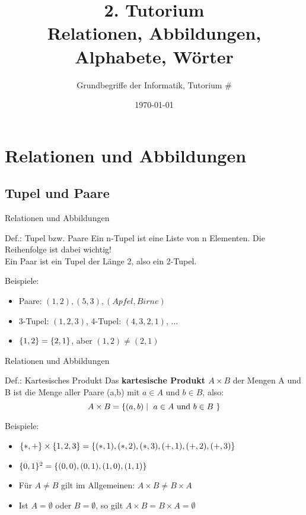 

\title[Relationen, Abbildungen, Alphabete, Wörter]{2. Tutorium\\ Relationen, Abbildungen, Alphabete, Wörter}
\subtitle{Grundbegriffe der Informatik, Tutorium \#\mytutnumber}
\date{\today}


\titleframe
\roadmap

\section{Relationen und Abbildungen}
\subsection{Tupel und Paare}

	\begin{frame}{Relationen und Abbildungen}
		\begin{block}{Def.: Tupel bzw. Paare}
			Ein n-Tupel ist eine Liste von n Elementen. Die Reihenfolge ist dabei wichtig!\\
			Ein Paar ist ein Tupel der Länge 2, also ein 2-Tupel.			
		\end{block}
		\begin{exampleblock}{Beispiele:}
			\begin{itemize}
				\item Paare: $(1,2),(5,3),(Apfel, Birne)$
				\item 3-Tupel: $(1,2,3)$, 4-Tupel: $(4,3,2,1)$, ...
				\item $\{ 1,2 \}=\{ 2,1 \}$, aber $(1,2)\neq(2,1)$
			\end{itemize}			
		\end{exampleblock}	
	\end{frame}

	\begin{frame}{Relationen und Abbildungen}
		\begin{block}{Def.: Kartesisches Produkt}
			Das \textbf{kartesische Produkt $A \times B$} der Mengen A und B ist die Menge aller Paare (a,b) mit $a \in A$ und $b \in B$, also:
			$$A \times B = \{ (a,b) \mid \text{ $a \in A$ und $b \in B$ } \}$$
		\end{block}
	
		\begin{exampleblock}{Beispiele:}
			\begin{itemize}
				\item $\{ *, + \} \times \{ 1, 2, 3 \} = \{ (*,1), (*,2), (*,3), (+,1), (+,2), (+,3) \}$
				\item $\{ 0,1 \}^2 = \{ (0,0),(0,1),(1,0),(1,1) \}$ 
				\item Für $A \neq B$ gilt im Allgemeinen: $A \times B \neq B \times A$
				\item Ist $A = \emptyset$ oder $B = \emptyset$, so gilt $A \times B = B \times A = \emptyset$
			\end{itemize}			
		\end{exampleblock}
	\end{frame}
